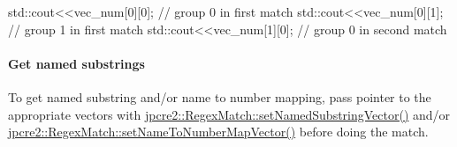 \begin{DoxyCode}
std::cout<<vec\_num[0][0]; \textcolor{comment}{// group 0 in first match}
std::cout<<vec\_num[0][1]; \textcolor{comment}{// group 1 in first match}
std::cout<<vec\_num[1][0]; \textcolor{comment}{// group 0 in second match}
\end{DoxyCode}
 \hypertarget{index_get-named-substrings}{}\paragraph{Get named substrings}\label{index_get-named-substrings}
To get named substring and/or name to number mapping, pass pointer to the appropriate vectors with {\ttfamily \hyperlink{classjpcre2_1_1RegexMatch_ae495431f57cae54363331237ab21b56c}{jpcre2\+::\+Regex\+Match\+::set\+Named\+Substring\+Vector()}} and/or {\ttfamily \hyperlink{classjpcre2_1_1RegexMatch_a04926e61d8b5f1d8bdf344efecd567d8}{jpcre2\+::\+Regex\+Match\+::set\+Name\+To\+Number\+Map\+Vector()}} before doing the match.


